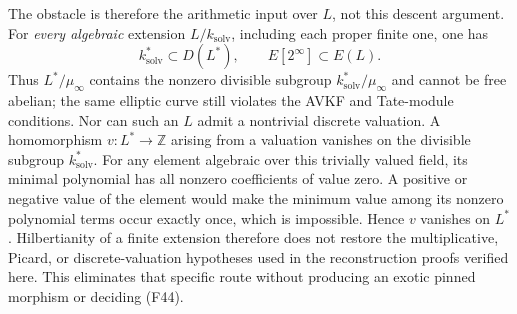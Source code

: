The obstacle is therefore the arithmetic input over $L$, not this
descent argument. For \emph{every algebraic} extension
$L/k_{\mathrm{solv}}$, including each proper finite one, one has
\[
 k_{\mathrm{solv}}^*\subset D(L^*),\qquad
 E[2^\infty]\subset E(L).
\]
Thus $L^*/\mu_\infty$ contains the nonzero divisible subgroup
$k_{\mathrm{solv}}^*/\mu_\infty$ and cannot be free abelian;
the same elliptic curve still violates the AVKF and Tate-module
conditions. Nor can such an $L$ admit a nontrivial discrete
valuation. A homomorphism $v:L^*\to\mathbb Z$ arising from a
valuation vanishes on the divisible subgroup $k_{\mathrm{solv}}^*$.
For any element algebraic over this trivially valued field, its
minimal polynomial has all nonzero coefficients of value zero.
A positive or negative value of the element would make the
minimum value among its nonzero polynomial terms occur exactly
once, which is impossible. Hence $v$ vanishes on $L^*$.
Hilbertianity of a finite extension therefore does not restore
the multiplicative, Picard, or discrete-valuation hypotheses used
in the reconstruction proofs verified here. This eliminates that
specific route without producing an exotic pinned morphism or
deciding (F44).
